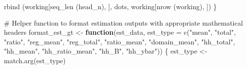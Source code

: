 \documentclass[
  letterpaper,
  DIV=11,
  numbers=noendperiod]{scrreprt}
\newenvironment{Shaded}{\begin{snugshade}}{\end{snugshade}}
\newcommand{\AttributeTok}[1]{\textcolor[rgb]{0.40,0.45,0.13}{#1}}
\newcommand{\CommentTok}[1]{\textcolor[rgb]{0.37,0.37,0.37}{#1}}
\newcommand{\ControlFlowTok}[1]{\textcolor[rgb]{0.00,0.23,0.31}{\textbf{#1}}}
\newcommand{\FunctionTok}[1]{\textcolor[rgb]{0.28,0.35,0.67}{#1}}
\newcommand{\NormalTok}[1]{\textcolor[rgb]{0.00,0.23,0.31}{#1}}
\newcommand{\OtherTok}[1]{\textcolor[rgb]{0.00,0.23,0.31}{#1}}
\newcommand{\StringTok}[1]{\textcolor[rgb]{0.13,0.47,0.30}{#1}}
\renewcommand{\[}{\begin{equation}}
\renewcommand{\]}{\end{equation}}
\begin{document}
\begin{Shaded}
\begin{Highlighting}[]
    \FunctionTok{rbind}\NormalTok{ (working[}\FunctionTok{seq\_len}\NormalTok{ (head\_n), ], dots, working[}\FunctionTok{nrow}\NormalTok{ (working), ])}
\NormalTok{\}}

\CommentTok{\# Helper function to format estimation outputs with appropriate mathematical headers}
\NormalTok{format\_est\_gt }\OtherTok{\textless{}{-}} \ControlFlowTok{function}\NormalTok{(est\_data, }\AttributeTok{est\_type =} \FunctionTok{c}\NormalTok{(}\StringTok{"mean"}\NormalTok{, }\StringTok{"total"}\NormalTok{, }\StringTok{"ratio"}\NormalTok{, }\StringTok{"reg\_mean"}\NormalTok{, }\StringTok{"reg\_total"}\NormalTok{, }\StringTok{"ratio\_mean"}\NormalTok{, }\StringTok{"domain\_mean"}\NormalTok{,}
                                                 \StringTok{"hh\_total"}\NormalTok{, }\StringTok{"hh\_mean"}\NormalTok{, }\StringTok{"hh\_ratio\_mean"}\NormalTok{, }\StringTok{"hh\_B"}\NormalTok{, }\StringTok{"hh\_ybar"}\NormalTok{)) \{}
\NormalTok{  est\_type }\OtherTok{\textless{}{-}} \FunctionTok{match.arg}\NormalTok{(est\_type)}


\end{Highlighting}
\end{Shaded}
\end{document}

